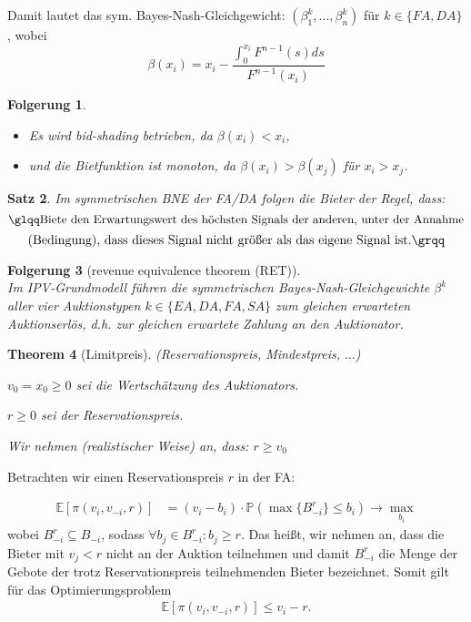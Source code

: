 \documentclass[12pt]{extreport} %
\theoremstyle{named}
\newtheorem{unnamedtheorem}{Theorem} \counterwithin{unnamedtheorem}{chapter}
\theoremstyle{nnamed}
\theoremstyle{itshape}
\newtheorem{satz}[unnamedtheorem]{Satz}
\theoremstyle{normal}
\newtheorem{folgerung}[unnamedtheorem]{Folgerung}
\begin{document}
Damit lautet das sym. Bayes-Nash-Gleichgewicht: $(\beta_{1}^{k}, \dotsc, \beta_{n}^{k})$ für $k \in \{ FA, DA \}$, wobei
$$ \beta(x_{i}) = x_{i} - \frac{\int_{0}^{x_{i}} F^{n-1}(s) ds}{F^{n-1}(x_{i})} $$

\begin{folgerung} ~\
	\begin{itemize}
		\item Es wird bid-shading betrieben, da $\beta(x_{i}) < x_{i}$,
		\item und die Bietfunktion ist monoton, da $\beta(x_{i}) > \beta(x_{j})$ für $x_{i} > x_{j}$.
	\end{itemize}	 
\end{folgerung}

\begin{satz}
	Im symmetrischen BNE der FA/DA folgen die Bieter der Regel, dass: 
	$$ \text{{\glqq}Biete den Erwartungswert des höchsten Signals der anderen, unter der Annahme} $$
	$$ \text{(Bedingung), dass dieses Signal nicht größer als das eigene Signal ist.\grqq} $$
\end{satz}

 
\begin{folgerung}[revenue equivalence theorem (RET)] ~\\
Im IPV-Grundmodell führen die symmetrischen Bayes-Nash-Gleichgewichte $\beta^k$ aller vier Auktionstypen $k \in \{EA, DA, FA, SA\}$ zum gleichen erwarteten Auktionserlös, d.h. zur gleichen erwartete Zahlung an den Auktionator.
\end{folgerung}

\begin{unnamedtheorem}[Limitpreis] (Reservationspreis, Mindestpreis, $\dotsc$) 
\begin{description}
	\item $v_{0} = x_{0} \geq 0$ sei die Wertschätzung des Auktionators.
	\item $r \geq 0$ sei der Reservationspreis.
\end{description}

Wir nehmen (realistischer Weise) an, dass: $r \geq v_{0}$		
\end{unnamedtheorem}

Betrachten wir einen Reservationspreis $r$ in der FA:

\begin{align*}
	\mathbb{E}\left[ \pi\left(v_{i}, v_{-i}, r \right) \right] & = \left( v_{i} - b_{i} \right) \cdot \mathbb{P}\left(\max \{ B_{-i}^{r} \} \leq b_{i} \right) \longrightarrow \max_{b_{i}}
\end{align*}
wobei $B_{-i}^{r} \subseteq B_{-i}$, sodass $\forall b_{j} \in B_{-i}^{r}: b_{j} \geq r$. Das heißt, wir nehmen an, dass die Bieter mit $v_{j} < r$ nicht an der Auktion teilnehmen und damit $B_{-i}^{r}$ die Menge der Gebote der trotz Reservationspreis teilnehmenden Bieter bezeichnet. Somit gilt für das Optimierungsproblem
\begin{align*}
	\mathbb{E}\left[ \pi\left(v_{i}, v_{-i}, r \right) \right] \leq v_i - r.
\end{align*}
\end{document}
